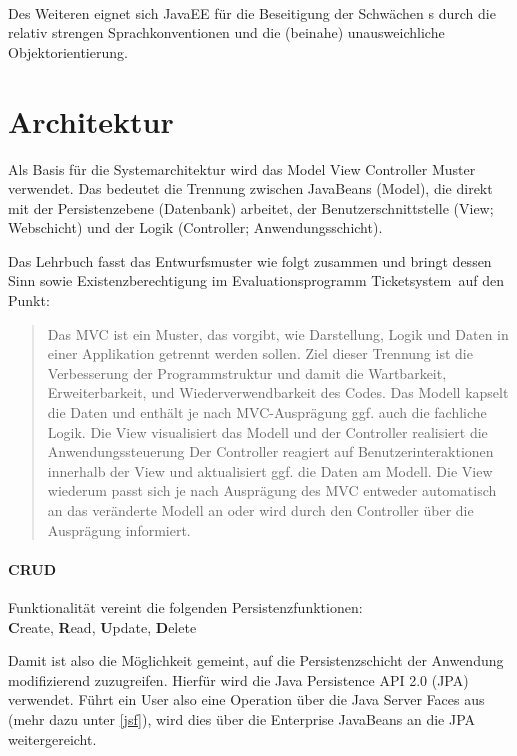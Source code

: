 \paragraph{}
Des Weiteren eignet sich JavaEE für die Beseitigung der Schwächen \getOst s durch die relativ strengen Sprachkonventionen und die (beinahe) unausweichliche Objektorientierung.

\section{Architektur}
Als Basis für die Systemarchitektur wird das Model View Controller Muster verwendet. Das bedeutet die Trennung zwischen JavaBeans (Model), die direkt mit der Persistenzebene (Datenbank) arbeitet, der Benutzerschnittstelle (View; Webschicht) und der Logik (Controller; Anwendungsschicht).

Das Lehrbuch fasst das Entwurfsmuster wie folgt zusammen und bringt dessen Sinn sowie Existenzberechtigung im Evaluationsprogramm \glqq Ticketsystem\grqq\ auf den Punkt:

\blockcquote{javaeeworkshop}{
	Das MVC ist ein Muster, das vorgibt, wie Darstellung, Logik und Daten in einer Applikation getrennt werden sollen. Ziel dieser Trennung ist die Verbesserung der Programmstruktur und damit die Wartbarkeit, Erweiterbarkeit, und Wiederverwendbarkeit des Codes.
	Das Modell kapselt die Daten und enthält je nach MVC-Ausprägung ggf. auch die fachliche Logik. Die View visualisiert das Modell und der Controller realisiert die Anwendungssteuerung Der Controller reagiert auf Benutzerinteraktionen innerhalb der View und aktualisiert ggf. die Daten am Modell. Die View wiederum passt sich je nach Ausprägung des MVC entweder automatisch an das veränderte Modell an oder wird durch den Controller über die Ausprägung informiert.
}

\paragraph{CRUD} Funktionalität vereint die folgenden Persistenzfunktionen:\\
\textbf{C}reate, \textbf{R}ead, \textbf{U}pdate, \textbf{D}elete

Damit ist also die Möglichkeit gemeint, auf die Persistenzschicht der Anwendung modifizierend zuzugreifen. Hierfür wird die Java Persistence API 2.0 (JPA) verwendet. Führt ein User also eine Operation über die Java Server Faces aus (mehr dazu unter \ref{jsf}), wird dies über die Enterprise JavaBeans an die JPA weitergereicht.

